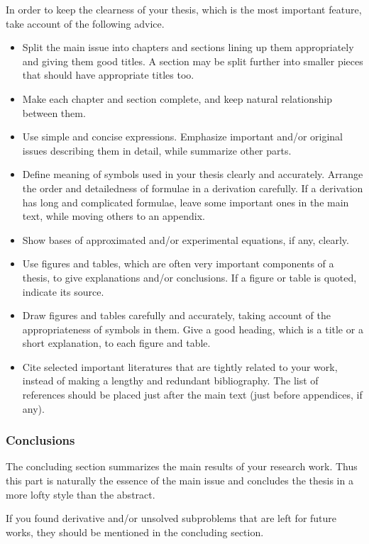 In order to keep the clearness of your thesis, which is the most important
feature, take account of the following advice.
\begin{itemize}%
\item
Split the main issue into chapters and sections lining up them appropriately
and giving them good titles.  A section may be split further into smaller
pieces that should have appropriate titles too.
\item
Make each chapter and section complete, and keep natural relationship
between them.
\item
Use simple and concise expressions.  Emphasize important and/or original
issues describing them in detail, while summarize other parts.
\item
Define meaning of symbols used in your thesis clearly and accurately.
Arrange the order and detailedness of formulae in a derivation carefully.
If a derivation has long and complicated formulae, leave some important ones
in the main text, while moving others to an appendix.
\item
Show bases of approximated and/or experimental equations, if any, clearly.
\item
Use figures and tables, which are often very important components of a
thesis, to give explanations and/or conclusions.  If a figure or table is
quoted, indicate its source.
\item
Draw figures and tables carefully and accurately, taking account of the
appropriateness of symbols in them.  Give a good heading, which is a title
or a short explanation, to each figure and table.
\item
Cite selected important literatures that are tightly related to your work,
instead of making a lengthy and redundant bibliography.  The list of
references should be placed just after the main text (just before
appendices, if any).
\end{itemize}%

\subsubsection{Conclusions}\label{subsubsec-conclusion}
The concluding section summarizes the main results of your research work.
Thus this part is naturally the essence of the main issue and concludes the
thesis in a more lofty style than the abstract.

If you found derivative and/or unsolved subproblems that are left for
future works, they should be mentioned in the concluding section.

